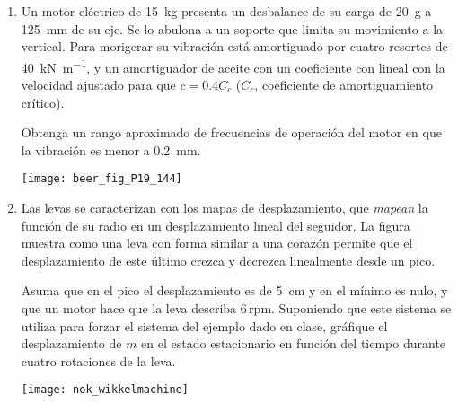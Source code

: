 \documentclass[11pt, spanish, a4paper, twopage]{article}
\begin{document}
\begin{enumerate}
\item 
\begin{minipage}[t][3.5cm]{0.75\textwidth}
Un motor eléctrico de \SI{15}{\kilo\gram} presenta un desbalance de su carga de \SI{20}{\gram} a \SI{125}{\milli\metre} de su eje.
Se lo abulona a un soporte que limita su movimiento a la vertical.
Para morigerar su vibración está amortiguado por cuatro resortes de \SI{40}{\kilo\newton\per\metre}, y un amortiguador de aceite con un coeficiente con lineal con la velocidad ajustado para que $c = 0.4 C_c$ ($C_c$, coeficiente de amortiguamiento crítico).

Obtenga un rango aproximado de frecuencias de operación del motor en que la vibración es menor a \SI{0.2}{\milli\metre}.
\end{minipage}
\begin{minipage}[c][2cm][t]{0.2\textwidth}
	\texttt{[image: beer\_fig\_P19\_144]}
\end{minipage}



\item 
\begin{minipage}[t][3.5cm]{0.75\textwidth}
Las levas se caracterizan con los mapas de desplazamiento, que \emph{mapean} la función de su radio en un desplazamiento lineal del seguidor.
La figura muestra como una leva con forma similar a una corazón permite que el desplazamiento de este último crezca y decrezca linealmente desde un pico.
				
Asuma que en el pico el desplazamiento es de \SI{5}{\centi\metre} y en el mínimo es nulo, y que un motor hace que la leva describa $6\,\mathrm{rpm}$.  
Suponiendo que este sistema se utiliza para forzar el sistema del ejemplo dado en clase, gráfique el desplazamiento de $m$ en el estado estacionario en función del tiempo durante cuatro rotaciones de la leva.
\end{minipage}
\begin{minipage}[c][2cm][t]{0.2\textwidth}
	\texttt{[image: nok\_wikkelmachine]}
\end{minipage}




\end{enumerate}
\end{document}
